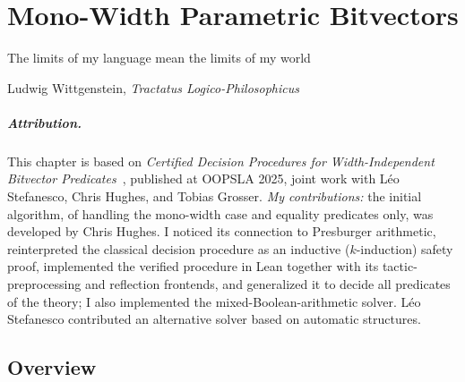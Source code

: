 \chapter{Mono-Width Parametric Bitvectors}
\label{ch:mono-width}
\epigraph{The limits of my language mean the limits of my world}{Ludwig Wittgenstein, \emph{Tractatus Logico-Philosophicus}}

\paragraph*{Attribution.} This chapter is based on \emph{Certified Decision
Procedures for Width-Independent Bitvector Predicates}~\citep{bhat2025certified},
published at OOPSLA 2025, joint work with Léo Stefanesco, Chris Hughes, and
Tobias Grosser.
\emph{My contributions:} the initial algorithm, of handling the mono-width case and
equality predicates only, was developed by Chris Hughes. I noticed its
connection to Presburger arithmetic, reinterpreted the classical decision
procedure as an inductive ($k$-induction) safety proof, implemented the verified
procedure in Lean together with its tactic-preprocessing and reflection
frontends, and generalized it to decide all predicates of the theory; I also
implemented the mixed-Boolean-arithmetic solver. Léo Stefanesco contributed an
alternative solver based on automatic structures.

\section{Overview}
\label{sec:swbv:overview}


